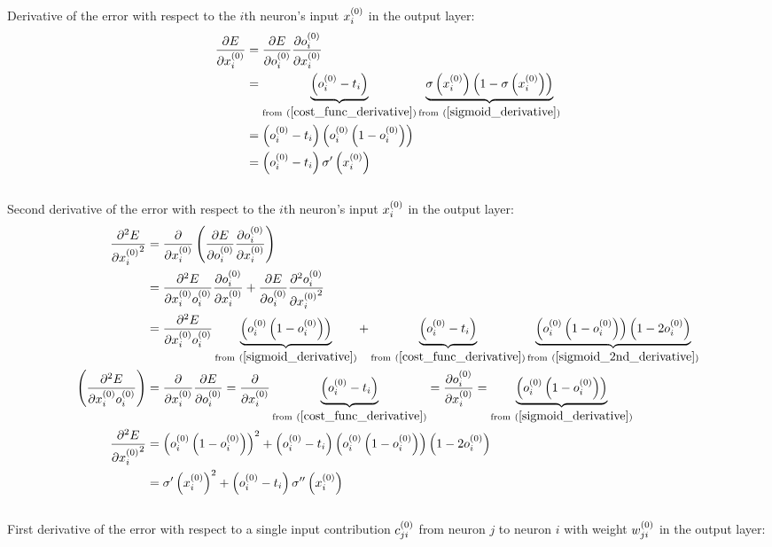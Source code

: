\\[5pt]Derivative of the error with respect to the $i$th neuron's input $x_{i}^{(0)}$ in the output layer:
\begin{align}
\pdv{E}{\Input i 0} &= \pdv{E}{\Out i 0} \pdv{\Out i 0}{\Input i 0} 
\\
&= \underbrace{\left(\Out i 0 - \Target i\right)}_{\text{from} \ (\ref{cost_func_derivative})} \underbrace{\sigma\left(\Input i 0\right)\left(1 - \sigma\left(\Input i 0\right)\right)}
_{\text{from} \ (\ref{sigmoid_derivative})}
\\
&= \left(\Out i 0 - \Target i\right)\left(\Out i 0 \left(1 - \Out i 0\right)\right)
\\
&= \left(\Out i 0 - \Target i\right)\sigma^{\prime}\left(\Input i 0\right)\label{dedx}
\end{align}
\\[5pt]Second derivative of the error with respect to the $i$th neuron's input $x_{i}^{(0)}$ in the output layer:
\begin{align}
\pdv[2]{E}{{\Input i 0}} &= \pdv{}{\Input i 0}
\left(\pdv{E}{\Out i 0}\pdv{\Out i 0}{\Input i 0}\right) 
\\
&= \pdv{{^2}E}{{\Input i 0}{\Out i 0}}\pdv{\Out i 0}{\Input i 0} + \pdv{E}{\Out i 0}\pdv[2]{\Out i 0}{{\Input i 0}}
\\
&= \pdv{{^2}E}{{\Input i 0}{\Out i 0}}\underbrace{\left(\Out i 0 \left(1 - \Out i 0\right)\right)}_{{\text{from} \ (\ref{sigmoid_derivative})}} + \underbrace{\left(\Out i 0 - \Target i\right)}_{\text{from} \ (\ref{cost_func_derivative})}\underbrace{\left(\Out i 0 \left(1 - \Out i 0\right)\right)\left(1 - 2\Out i 0\right) }_{\text{from}\ (\ref{sigmoid_2nd_derivative})}
\\
\left(\pdv{{^2}E}{{\Input i 0}{\Out i 0}}\right) &= \pdv{}{\Input i 0}\pdv{E}{\Out i 0} = \pdv{}{\Input i 0}\underbrace{\left(\Out i 0 - \Target i\right)}_{\text{from} \ (\ref{cost_func_derivative})} = \pdv{\Out i 0}{\Input i 0} = \underbrace{\left(\Out i 0 \left(1 - \Out i 0\right)\right)}_{{\text{from} \ (\ref{sigmoid_derivative})}} 
\\
\pdv[2]{E}{{\Input i 0}}&= \left(\Out i 0 \left(1 - \Out i 0\right)\right)^2 + \left(\Out i 0 - \Target i\right)\left(\Out i 0 \left(1 - \Out i 0\right)\right)\left(1 - 2\Out i 0\right) 
\\
&= \sigma^{\prime}\left(\Input i 0\right)^2 + \left(\Out i 0 - \Target i\right)\sigma^{\prime\prime}\left(\Input i 0\right)\label{d2edx2}
\end{align}
\\[5pt]First derivative of the error with respect to a single input contribution $c_{ji}^{(0)}$ from neuron $j$ to neuron $i$ with weight $w_{ji}^{(0)}$ in the output layer:
